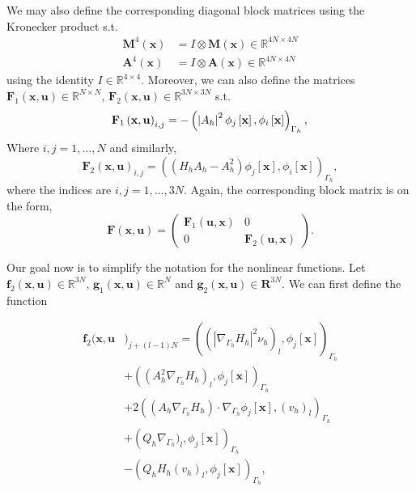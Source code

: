 We may also define the corresponding diagonal block matrices using the Kronecker product s.t.
\[
    \begin{split}
        \mathbf{M}^{4}( \mathbf{x} )  &= I \otimes \mathbf{M}( \mathbf{x}) \in \mathbb{R} ^{4N \times 4N} \\
\mathbf{A}^{4}( \mathbf{x} )   & = I \otimes \mathbf{A}( \mathbf{x}
) \in \mathbb{R} ^{4N \times 4N}
    \end{split}
\]
using the identity $I \in \mathbb{R} ^{4\times 4}$. Moreover, we can also define the matrices $\mathbf{F}_{1} \left( \mathbf{x}, \mathbf{u} \right) \in  \mathbb{R}^{N \times N} $, $\mathbf{F}_{2} \left( \mathbf{x}, \mathbf{u} \right) \in
\mathbb{R}^{3N \times 3N} $  s.t.
\[
    \mathbf{F}_{1}\left( \mathbf{x},\mathbf{u} \right)_{i,j}    = - \left( \left\lvert A_{h} \right\rvert^2  \phi_{j} \left[ \mathbf{x} \right] , \phi_{i} \left[ \mathbf{x} \right]  \right)_{\Gamma _{h}},  \\
\]
Where $i,j = 1,\ldots,N $ and similarly,
\[
    \mathbf{F}_{2}\left( \mathbf{x},\mathbf{u} \right)_{i,j}    =  \left( (H_{h} A_{h} - A^2_{h})  \phi_{j} \left[ \mathbf{x} \right] , \phi_{i} \left[ \mathbf{x} \right]  \right)_{\Gamma _{h}},
\]
where the indices are $i,j = 1,\ldots, 3N$.
 Again, the corresponding block matrix is on the form,
\[
\mathbf{F}\left( \mathbf{x}, \mathbf{u} \right) = \begin{pmatrix}
\mathbf{F}_{1}( \mathbf{u}, \mathbf{x} ) &  0 \\
0 &  \mathbf{F}_{2}(\mathbf{u}, \mathbf{x})
\end{pmatrix}.
\]

Our goal now is to simplify the notation for the nonlinear functions. Let $\mathbf{f}_{2}( \mathbf{x}, \mathbf{u}) \in  \mathbb{R} ^{3N} $, $\mathbf{g}_{1}( \mathbf{x}, \mathbf{u}) \in \mathbb{R} ^{N} $ and $\mathbf{g}_{2}( \mathbf{x} , \mathbf{u})
\in \mathbf{R}^{3N} $. We can first define the function

\begin{equation*}
    \begin{split}
        \mathbf{f}_{2}( \mathbf{x}, \mathbf{u}&)_{j + (l-1)N} = ( ( \left\lvert \nabla _{\Gamma _{h}} H_{h} \right\rvert ^2 \nu _{h})_{l} , \phi_{j}\left[ \mathbf{x} \right]   ) _{\Gamma _{h}}   \\
        & + ((A_{h}^2 \nabla _{\Gamma _{h}}H_{h})_{l}, \phi _{j} \left[ \mathbf{x} \right]  )_{\Gamma _{h}} \\
        & + 2((A_{h} \nabla _{\Gamma _{h}} H_{h})\cdot \nabla _{\Gamma _{h}} \phi _{j} \left[ \mathbf{x} \right] , ( v_{h}) _{l})_{\Gamma _{h}} \\
    & + \left(Q_{h}\nabla _{\Gamma _{h}})_{l},  \phi_{j} \left[ \mathbf{x} \right]  \right)_{\Gamma _{h}} \\
    &- \left(Q_{h} H_{h} ( v_{h}) _{l}, \phi _{j} \left[ \mathbf{x} \right]   \right)_{\Gamma_{h} },
    \end{split}
\end{equation*}

